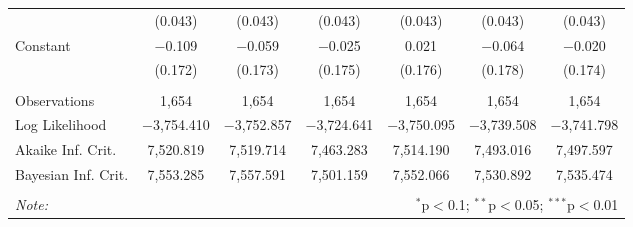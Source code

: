 \begin{sidewaystable}[!htbp]
\begin{tabular}{@{\extracolsep{5pt}}lcccccc}
  & (0.043) & (0.043) & (0.043) & (0.043) & (0.043) & (0.043) \\ 
  Constant & $-$0.109 & $-$0.059 & $-$0.025 & 0.021 & $-$0.064 & $-$0.020 \\ 
  & (0.172) & (0.173) & (0.175) & (0.176) & (0.178) & (0.174) \\ 
 \hline \\[-1.8ex] 
Observations & 1,654 & 1,654 & 1,654 & 1,654 & 1,654 & 1,654 \\ 
Log Likelihood & $-$3,754.410 & $-$3,752.857 & $-$3,724.641 & $-$3,750.095 & $-$3,739.508 & $-$3,741.798 \\ 
Akaike Inf. Crit. & 7,520.819 & 7,519.714 & 7,463.283 & 7,514.190 & 7,493.016 & 7,497.597 \\ 
Bayesian Inf. Crit. & 7,553.285 & 7,557.591 & 7,501.159 & 7,552.066 & 7,530.892 & 7,535.474 \\ 
\hline 
\hline \\[-1.8ex] 
\textit{Note:}  & \multicolumn{6}{r}{$^{*}$p$<$0.1; $^{**}$p$<$0.05; $^{***}$p$<$0.01} \\ 
\end{tabular} 
\end{sidewaystable} 
